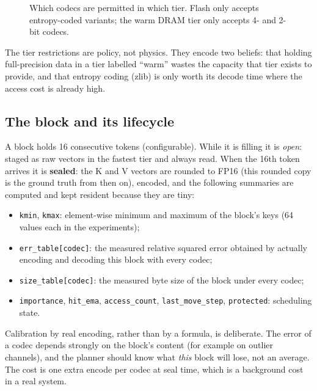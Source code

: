 \documentclass[12pt,a4paper]{report}
\begin{document}
\begin{figure}[htbp]
{
}
\caption{Which codecs are permitted in which tier. Flash only accepts entropy-coded variants; the warm DRAM tier only accepts 4- and 2-bit codecs.}
\end{figure}
The tier restrictions are policy, not physics. They encode two beliefs: that holding full-precision data in a tier labelled “warm” wastes the capacity that tier exists to provide, and that entropy coding (zlib) is only worth its decode time where the access cost is already high.

\subsection{The block and its lifecycle}\label{sec:5_3}
A block holds 16 consecutive tokens (configurable). While it is filling it is \textit{open}: staged as raw vectors in the fastest tier and always read. When the 16th token arrives it is \textbf{sealed}: the K and V vectors are rounded to FP16 (this rounded copy is the ground truth from then on), encoded, and the following summaries are computed and kept resident because they are tiny:

\begin{itemize}
\item \texttt{kmin}, \texttt{kmax}: element-wise minimum and maximum of the block's keys (64 values each in the experiments);
\item \texttt{err\_\allowbreak{}\allowbreak{}table[codec]}: the measured relative squared error obtained by actually encoding and decoding this block with every codec;
\item \texttt{size\_\allowbreak{}\allowbreak{}table[codec]}: the measured byte size of the block under every codec;
\item \texttt{importance}, \texttt{hit\_\allowbreak{}\allowbreak{}ema}, \texttt{access\_\allowbreak{}\allowbreak{}count}, \texttt{last\_\allowbreak{}\allowbreak{}move\_\allowbreak{}\allowbreak{}step}, \texttt{protected}: scheduling state.
\end{itemize}
Calibration by real encoding, rather than by a formula, is deliberate. The error of a codec depends strongly on the block's content (for example on outlier channels), and the planner should know what \textit{this} block will lose, not an average. The cost is one extra encode per codec at seal time, which is a background cost in a real system.
\end{document}
